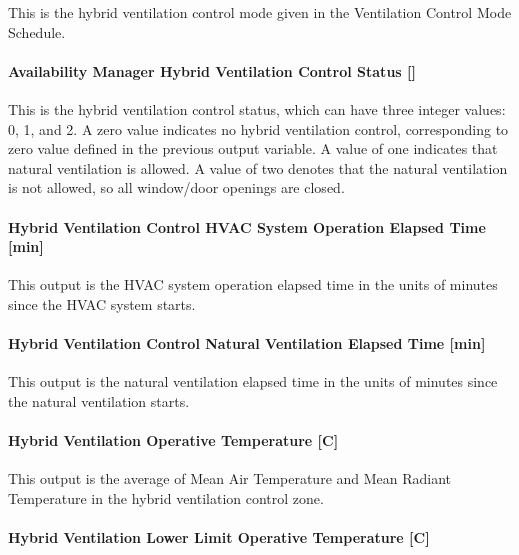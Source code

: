 This is the hybrid ventilation control mode given in the Ventilation Control Mode Schedule.

\paragraph{Availability Manager Hybrid Ventilation Control Status {[]}}\label{availability-manager-hybrid-ventilation-control-status}

This is the hybrid ventilation control status, which can have three integer values: 0, 1, and 2. A zero value indicates no hybrid ventilation control, corresponding to zero value defined in the previous output variable. A value of one indicates that natural ventilation is allowed. A value of two denotes that the natural ventilation is not allowed, so all window/door openings are closed.

\paragraph{Hybrid Ventilation Control HVAC System Operation Elapsed Time {[min]}}\label{hybrid-ventilation-control-hvac-system-operation-elapsed-time}

This output is the HVAC system operation elapsed time in the units of minutes since the HVAC system starts.

\paragraph{Hybrid Ventilation Control Natural Ventilation Elapsed Time {[min]}}\label{hybrid-ventilation-control-natural-ventilation-elapsed-time}

This output is the natural ventilation elapsed time in the units of minutes since the natural ventilation starts.

\paragraph{Hybrid Ventilation Operative Temperature {[C]}}\label{hybrid-ventilation-operative-temperature}

This output is the average of Mean Air Temperature and Mean Radiant Temperature in the hybrid ventilation control zone.

\paragraph{Hybrid Ventilation Lower Limit Operative Temperature {[C]}}\label{hybrid-ventilation-lower-limit-operative-temperature}

